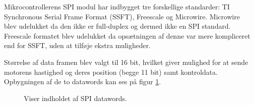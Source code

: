 Mikrocontrollerens SPI modul har indbygget tre forskellige standarder: TI Synchronous Serial Frame Format (SSFT), Freescale og Microwire. 
Microwire blev udelukket da den ikke er full-duplex og dermed ikke en SPI standard. 
Freescale formatet blev udelukket da opsætningen af denne var mere kompliceret end for SSFT, uden at tilføje ekstra muligheder.

Størrelse af data framen blev valgt til 16 bit, hvilket giver mulighed for at sende motorens hastighed og deres position (begge 11 bit) samt kontroldata. Opbygningen af de to datawords kan ses på figur \ref{fig:protokol1}.



\begin{figure}[h!]
\centering
{}
\qquad
{}
\caption[Indholdet af SPI datawords]{Viser indholdet af SPI datawords. }
\label{fig:protokol1}
\end{figure}


